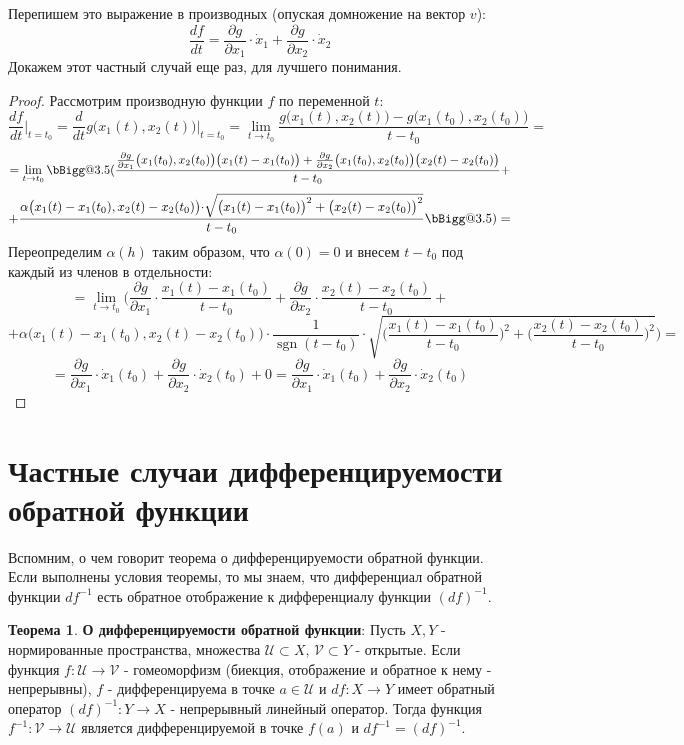 \documentclass[12pt]{article}
\makeatletter
\newcommand{\MU}{\mathcal{U}}
\newcommand{\MV}{\mathcal{V}}
\theoremstyle{definition}
\newtheorem{theorem}{Теорема}
\DeclareMathOperator{\sgn}{sgn}
\newcommand{\vast}{\bBigg@{3.5}}
\makeatother
\begin{document}
Перепишем это выражение в производных (опуская домножение на вектор $v$):
$$
	\dfrac{df}{dt} = \dfrac{\partial g}{\partial x_1}{\cdot}\dot{x}_1 + \dfrac{\partial g}{\partial x_2}{\cdot}\dot{x}_2
$$
Докажем этот частный случай еще раз, для лучшего понимания. 
\begin{proof}
	Рассмотрим производную функции $f$ по переменной $t$:
	$$
		\dfrac{df}{dt}\bigg|_{t = t_0} = \dfrac{d}{dt}g\big(x_1(t),x_2(t)\big)\bigg|_{t = t_0} = \lim\limits_{t \to t_0}\dfrac{g\big(x_1(t),x_2(t)\big) - g\big(x_1(t_0),x_2(t_0)\big)}{t - t_0} =
	$$
	$$
	 	= \lim\limits_{t \to t_0} \vast(\dfrac{\tfrac{\partial g}{\partial x_1} \big(x_1(t_0), x_2(t_0)\big)\big(x_1(t) - x_1(t_0)\big) + \tfrac{\partial g}{\partial x_2} \big(x_1(t_0), x_2(t_0)\big)\big(x_2(t) - x_2(t_0)\big)}{t - t_0} + 
	$$
	$$
	 	+ \dfrac{
	 		\alpha\big(x_1(t) - x_1(t_0), x_2(t) - x_2(t_0) \big){\cdot}
	 		\sqrt{
	 			\big(x_1(t) - x_1(t_0)\big)^2 + \big(x_2(t) - x_2(t_0)\big)^2 
			} 
	 	}{t - t_0}\vast) = 
	$$
	Переопределим $\alpha(h)$ таким образом, что $\alpha(0) = 0$ и внесем $t - t_0$ под каждый из членов в отдельности:
	$$
		= \lim\limits_{t \to t_0} \Bigg(\dfrac{\partial g}{\partial x_1}{\cdot}\dfrac{x_1(t) - x_1(t_0)}{t - t_0} + \dfrac{\partial g}{\partial x_2}{\cdot}\dfrac{x_2(t) - x_2(t_0)}{t - t_0} + 
	$$
	$$
		+ \alpha\big(x_1(t) - x_1(t_0), x_2(t) - x_2(t_0) \big){\cdot}\dfrac{1}{\sgn{(t-t_0)}}{\cdot} \sqrt{\bigg(\dfrac{x_1(t) - x_1(t_0)}{t - t_0}\bigg)^2 + \bigg(\dfrac{x_2(t) - x_2(t_0)}{t - t_0}\bigg)^2} \Bigg) = 
	$$
	$$
		= \dfrac{\partial g}{\partial x_1}{\cdot}\dot{x}_1(t_0) + \dfrac{\partial g}{\partial x_2}{\cdot}\dot{x}_2(t_0) + 0 = \dfrac{\partial g}{\partial x_1}{\cdot}\dot{x}_1(t_0) + \dfrac{\partial g}{\partial x_2}{\cdot}\dot{x}_2(t_0)
	$$
\end{proof}

\section*{Частные случаи дифференцируемости обратной функции}
Вспомним, о чем говорит теорема о дифференцируемости обратной функции. Если выполнены условия теоремы, то мы знаем, что дифференциал обратной функции $df^{-1}$ есть обратное отображение к дифференциалу функции $(df)^{-1}$.
\begin{theorem} \textbf{О дифференцируемости обратной функции}: 
	Пусть $X, Y$ - нормированные пространства, множества $\MU \subset X, \, \MV \subset Y$ - открытые. Если функция $f \colon \MU \to \MV$ - гомеоморфизм (биекция, отображение и обратное к нему - непрерывны), $f$ - дифференцируема в точке $a \in \MU$ и $df \colon X \to Y$ имеет  обратный оператор $(df)^{-1} \colon Y \to X$ - непрерывный линейный оператор. Тогда функция $f^{-1}\colon \MV \to \MU$ является дифференцируемой в точке $f(a)$ и $df^{-1} = (df)^{-1}$.
\end{theorem}
\end{document}
